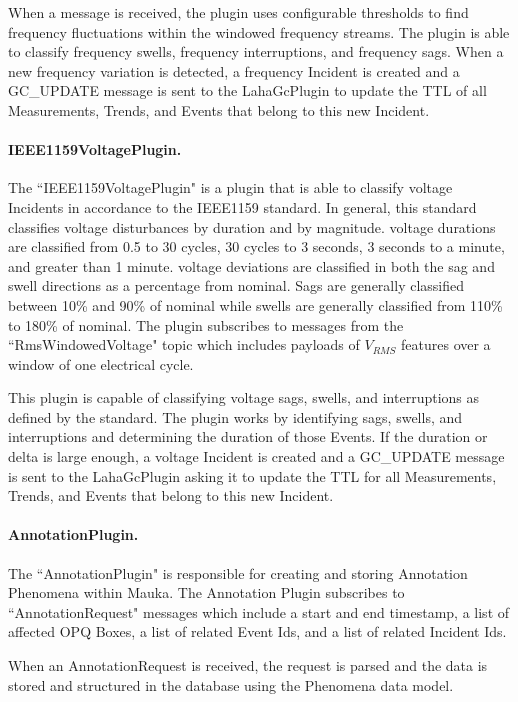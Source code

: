 When a message is received, the plugin uses configurable thresholds to find frequency fluctuations within the windowed frequency streams. The plugin is able to classify frequency swells, frequency interruptions, and frequency sags. When a new frequency variation is detected, a frequency Incident is created and a GC\_UPDATE message is sent to the LahaGcPlugin to update the TTL of all Measurements, Trends, and Events that belong to this new Incident.

\paragraph{IEEE1159VoltagePlugin.}
The ``IEEE1159VoltagePlugin" is a plugin that is able to classify voltage Incidents in accordance to the IEEE1159 standard\cite{IEEE:2018:1159D3}. In general, this standard classifies voltage disturbances by duration and by magnitude. voltage durations are classified from 0.5 to 30 cycles, 30 cycles to 3 seconds, 3 seconds to a minute, and greater than 1 minute. voltage deviations are classified in both the sag and swell directions as a percentage from nominal. Sags are generally classified between 10\% and 90\% of nominal while swells are generally classified from 110\% to 180\% of nominal.  The plugin subscribes to messages from the ``RmsWindowedVoltage" topic which includes payloads of $V_{RMS}$ features over a window of one electrical cycle.

This plugin is capable of classifying voltage sags, swells, and interruptions as defined by the standard. The plugin works by identifying sags, swells, and interruptions and determining the duration of those Events. If the duration or delta is large enough, a voltage Incident is created and a GC\_UPDATE message is sent to the LahaGcPlugin asking it to update the TTL for all Measurements, Trends, and Events that belong to this new Incident.

\paragraph{AnnotationPlugin.}

The ``AnnotationPlugin" is responsible for creating and storing Annotation Phenomena within Mauka. The Annotation Plugin subscribes to ``AnnotationRequest" messages which include a start and end timestamp, a list of affected OPQ Boxes, a list of related Event Ids, and a list of related Incident Ids.

When an AnnotationRequest is received, the request is parsed and the data is stored and structured in the database using the Phenomena data model.

